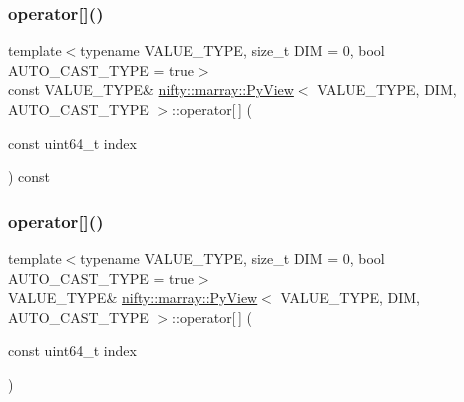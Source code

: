 \mbox{\label{classnifty_1_1marray_1_1PyView_a6a8eba72c1a16c0c93518fb56d9033f1}} 
\subsubsection{\texorpdfstring{operator[]()}{operator[]()}\hspace{0.1cm}{\footnotesize\ttfamily [1/2]}}
{\footnotesize\ttfamily template$<$typename V\+A\+L\+U\+E\+\_\+\+T\+Y\+PE, size\+\_\+t D\+IM = 0, bool A\+U\+T\+O\+\_\+\+C\+A\+S\+T\+\_\+\+T\+Y\+PE = true$>$ \\
const V\+A\+L\+U\+E\+\_\+\+T\+Y\+PE\& \hyperlink{classnifty_1_1marray_1_1PyView}{nifty\+::marray\+::\+Py\+View}$<$ V\+A\+L\+U\+E\+\_\+\+T\+Y\+PE, D\+IM, A\+U\+T\+O\+\_\+\+C\+A\+S\+T\+\_\+\+T\+Y\+PE $>$\+::operator\mbox{[}$\,$\mbox{]} (\begin{DoxyParamCaption}\item[{const uint64\+\_\+t}]{index }\end{DoxyParamCaption}) const\hspace{0.3cm}{\ttfamily [inline]}}

\mbox{\label{classnifty_1_1marray_1_1PyView_a64d9ff12fbe42e31b957b63180fceb82}} 
\subsubsection{\texorpdfstring{operator[]()}{operator[]()}\hspace{0.1cm}{\footnotesize\ttfamily [2/2]}}
{\footnotesize\ttfamily template$<$typename V\+A\+L\+U\+E\+\_\+\+T\+Y\+PE, size\+\_\+t D\+IM = 0, bool A\+U\+T\+O\+\_\+\+C\+A\+S\+T\+\_\+\+T\+Y\+PE = true$>$ \\
V\+A\+L\+U\+E\+\_\+\+T\+Y\+PE\& \hyperlink{classnifty_1_1marray_1_1PyView}{nifty\+::marray\+::\+Py\+View}$<$ V\+A\+L\+U\+E\+\_\+\+T\+Y\+PE, D\+IM, A\+U\+T\+O\+\_\+\+C\+A\+S\+T\+\_\+\+T\+Y\+PE $>$\+::operator\mbox{[}$\,$\mbox{]} (\begin{DoxyParamCaption}\item[{const uint64\+\_\+t}]{index }\end{DoxyParamCaption})\hspace{0.3cm}{\ttfamily [inline]}}

